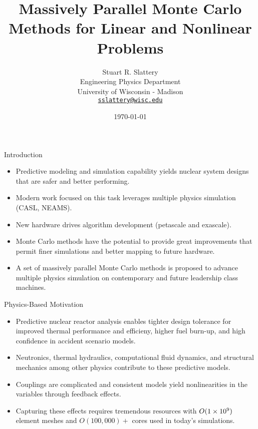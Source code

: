 \documentclass{beamer}
\author{Stuart R. Slattery
  \\ Engineering Physics Department
  \\ University of Wisconsin - Madison
  \\ \href{mailto:sslattery@wisc.edu}{\texttt{sslattery@wisc.edu}}
}
\date{\today}
\title{Massively Parallel Monte Carlo Methods for Linear and Nonlinear
Problems}
\begin{document}
\maketitle

\begin{frame}{Introduction}
  \begin{itemize}
    \item Predictive modeling and simulation capability yields nuclear
      system designs that are safer and better performing.
    \item Modern work focused on this task leverages multiple physics
      simulation (CASL, NEAMS).
    \item New hardware drives algorithm development (petascale and
      exascale).
    \item Monte Carlo methods have the potential to provide great
      improvements that permit finer simulations and better mapping to
      future hardware.
    \item A set of massively parallel Monte Carlo methods is proposed
      to advance multiple physics simulation on contemporary and
      future leadership class machines.
  \end{itemize}
\end{frame}

\begin{frame}{Physics-Based Motivation}
  \begin{itemize}
    \item Predictive nuclear reactor analysis enables tighter design
      tolerance for improved thermal performance and efficieny, higher
      fuel burn-up, and high confidence in accident scenario models.
    \item Neutronics, thermal hydraulics, computational fluid
      dynamics, and structural mechanics among other physics
      contribute to these predictive models.
    \item Couplings are complicated and consistent models yield
      nonlinearities in the variables through feedback effects.
    \item  Capturing  these   effects  requires  tremendous  resources
      with $O(1\times 10^{9})$ element meshes and $O(100,000)+$ cores used
      in today's simulations.
  \end{itemize}
\end{frame}
\end{document}

